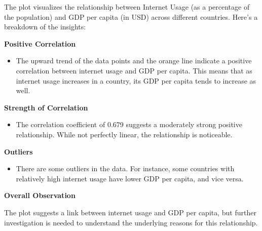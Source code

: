 \documentclass{article}\usepackage[]{graphicx}\usepackage[]{xcolor}
\begin{document}
The plot visualizes the relationship between Internet Usage (as a percentage of the population) and GDP per capita (in USD) across different countries. Here's a breakdown of the insights: 


\textbf{Positive Correlation}

\begin{itemize}
\item{The upward trend of the data points and the orange line indicate a positive correlation between internet usage and GDP per capita. This means that as internet usage increases in a country, its GDP per capita tends to increase as well.}
\end{itemize}

\textbf{Strength of Correlation}

\begin{itemize}
\item{The correlation coefficient of 0.679 suggests a moderately strong positive relationship. While not perfectly linear, the relationship is noticeable. }
\end{itemize}

\textbf{Outliers}
\begin{itemize}
\item{There are some outliers in the data.  For instance, some countries with relatively high internet usage have lower GDP per capita, and vice versa.}
\end{itemize}

\textbf{Overall Observation}

The plot suggests a link between internet usage and GDP per capita, but further investigation is needed to understand the underlying reasons for this relationship. 
\end{document}
